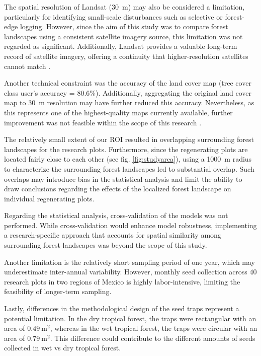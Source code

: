 The spatial resolution of Landsat (30~m) may also be considered a limitation, particularly for identifying small-scale disturbances such as selective or forest-edge logging. However, since the aim of this study was to compare forest landscapes using a consistent satellite imagery source, this limitation was not regarded as significant. Additionally, Landsat provides a valuable long-term record of satellite imagery, offering a continuity that higher-resolution satellites cannot match \citep{kennedyBringingEcologicalView2014a}.

Another technical constraint was the accuracy of the land cover map (tree cover class user's accuracy = 80.6\%). Additionally, aggregating the original land cover map to 30~m resolution may have further reduced this accuracy. Nevertheless, as this represents one of the highest-quality maps currently available, further improvement was not feasible within the scope of this research \citep{zanagaESAWorldCover102022}.

The relatively small extent of our \ac{ROI} resulted in overlapping surrounding forest landscapes for the research plots. Furthermore, since the regenerating plots are located fairly close to each other (see fig. \ref{fig:studyarea}), using a 1000~m radius to characterize the surrounding forest landscapes led to substantial overlap. Such overlaps may introduce bias in the statistical analysis and limit the ability to draw conclusions regarding the effects of the localized forest landscape on individual regenerating plots.

Regarding the statistical analysis, cross-validation of the models was not performed. While cross-validation would enhance model robustness, implementing a research-specific approach that accounts for spatial similarity among surrounding forest landscapes was beyond the scope of this study.

Another limitation is the relatively short sampling period of one year, which may underestimate inter-annual variability. However, monthly seed collection across 40 research plots in two regions of Mexico is highly labor-intensive, limiting the feasibility of longer-term sampling.

Lastly, differences in the methodological design of the seed traps represent a potential limitation. In the dry tropical forest, the traps were rectangular with an area of $0.49~\text{m}^2$, whereas in the wet tropical forest, the traps were circular with an area of $0.79~\text{m}^2$. This difference could contribute to the different amounts of seeds collected in wet vs dry tropical forest. 


